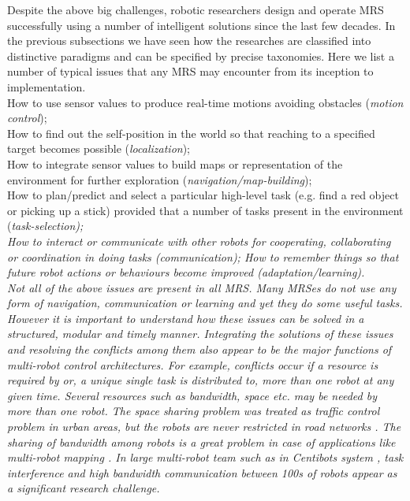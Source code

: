 Despite the above big challenges, robotic researchers design and operate MRS successfully using a number of intelligent solutions since the last few decades. In the previous subsections we have seen how the researches are classified into distinctive paradigms and can be specified by precise taxonomies. Here we list a number of typical issues that any MRS may encounter from its inception to implementation.\\
How to use sensor values to produce real-time motions avoiding obstacles ({\em motion control});\\
How to find out the self-position in the world so that reaching to a specified target becomes possible ({\em localization});\\
How to integrate sensor values to build maps or representation of the environment for further exploration ({\em navigation/map-building});\\
How to plan/predict and select a particular high-level task (e.g. find a red object or picking up a stick) provided that a number of tasks present in the environment (\em task-selection);\\
How to interact or communicate with other robots for cooperating, collaborating or coordination in doing tasks (\em communication);
How to remember things so that future robot actions or behaviours become improved ({\em adaptation/learning}).\\
Not all of the above issues are present in all MRS. Many MRSes do not use any form of navigation, communication or learning and yet they do some useful tasks. However it is important to understand how these issues can be solved in a structured, modular and timely manner.  Integrating the solutions of these issues and resolving the conflicts among them also appear to be the major functions of multi-robot control architectures. For example, conflicts occur if a resource is required by or, a unique single task is distributed to, more than one robot at any given time. Several resources such as bandwidth, space etc. may be needed by more than one robot. The space sharing problem was treated as traffic control problem in urban areas, but the robots are never restricted in road networks \cite{Cao+1997}. The sharing of bandwidth among robots is a great problem in case of applications like multi-robot mapping \cite{Konolige+2003}. In large multi-robot team such as in Centibots system \cite{Ortiz+2005}, task interference and high bandwidth communication between 100s of robots appear as a significant research challenge.
